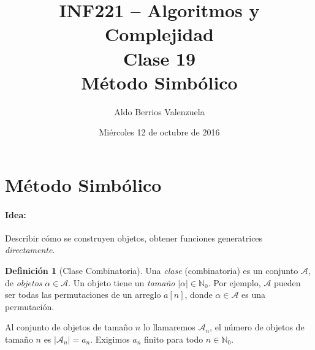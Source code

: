 \documentclass[english, spanish, fleqn, 10pt]{article}
\author{Aldo Berrios Valenzuela}
\title{INF221 -- Algoritmos y Complejidad\\[.4\baselineskip]Clase 19\\Método Simbólico}
\date{Miércoles 12 de octubre de 2016}
\numberwithin{equation}{section}
\newcommand{\nabsoluto}[1]{\left| #1 \right|}
\newcommand{\ncorchetes}[1]{\left[ #1 \right]}
\theoremstyle{definition}
\newtheorem{definition}{Definición}[section]
\begin{document}
\maketitle
\section{Método Simbólico}
\paragraph{Idea:} Describir cómo se construyen objetos, obtener funciones generatrices \emph{directamente}.

\begin{definition}[Clase Combinatoria]
	Una \emph{clase} (combinatoria) es un conjunto $\mathcal{A}$, de \emph{objetos} $\alpha \in \mathcal{A}$. Un objeto tiene un \emph{tamaño} $\nabsoluto{\alpha}\in\mathbb{N}_0$. Por ejemplo, $\mathcal{A}$ pueden ser todas las permutaciones de un arreglo $a\ncorchetes{n}$, donde $\alpha \in \mathcal{A}$ es una permutación.
\end{definition}

Al conjunto de objetos de tamaño $n$ lo llamaremos $\mathcal{A}_n$, el número de objetos de tamaño $n$ es $\nabsoluto{\mathcal{A}_n}=a_n$. Exigimos $a_n$ finito para todo $n\in\mathbb{N}_0$.
\end{document}
